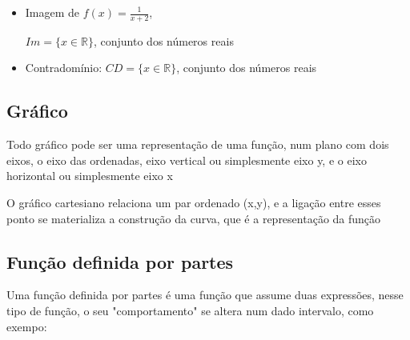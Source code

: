 \begin{multicols*}{2}
\begin{itemize}[wide, labelwidth=!, labelindent=0pt]
        \item Imagem de $f(x) = \frac{1}{x+2}$,

              $Im = \{x \in \mathbb{R} \}$, conjunto dos números reais

        \item Contradomínio: $CD = \{x \in \mathbb{R} \}$, conjunto dos números reais
    \end{itemize}

    \subsection{Gráfico}
    Todo gráfico pode ser uma representação de uma função, num plano com dois eixos, o eixo das 			ordenadas, eixo vertical ou simplesmente eixo y, e o eixo horizontal ou simplesmente eixo x

    O gráfico cartesiano relaciona um par ordenado (x,y), e a ligação entre esses ponto se 					materializa a construção da curva, que é a representação da função




    \subsection{Função definida por partes}
    Uma função definida por partes é uma função que assume duas expressões, nesse tipo de função, o 		seu "comportamento" se altera num dado intervalo, como exempo:


\end{multicols*}
